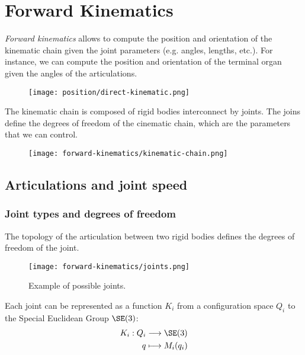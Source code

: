 \section{Forward Kinematics}
\emph{Forward kinematics} allows to compute the position and orientation of the kinematic chain given the joint parameters (e.g. angles, lengths, etc.). For instance, we can compute the position and orientation of the terminal organ given the angles of the articulations.
\begin{figure}[H]
    \centering
    \texttt{[image: position/direct-kinematic.png]}
\end{figure}

The kinematic chain is composed of rigid bodies interconnect by joints. The joins define the degrees of freedom of the cinematic chain, which are the parameters that we can control.
\begin{figure}[H]
    \centering
    \texttt{[image: forward-kinematics/kinematic-chain.png]}
\end{figure}

\subsection{Articulations and joint speed}
\subsubsection{Joint types and degrees of freedom}
The topology of the articulation between two rigid bodies defines the degrees of freedom of the joint.
\begin{figure}[H]
    \centering
    \texttt{[image: forward-kinematics/joints.png]}
    \caption{Example of possible joints.}
\end{figure}
Each joint can be represented as a function $K_i$ from a configuration space $Q_i$ to the Special Euclidean Group $\SE(3)$:
\begin{equation*}
    \begin{aligned}
        K_i: Q_i &\longrightarrow \SE(3)\\
        q &\longmapsto M_i(q_i)
    \end{aligned}
\end{equation*}

